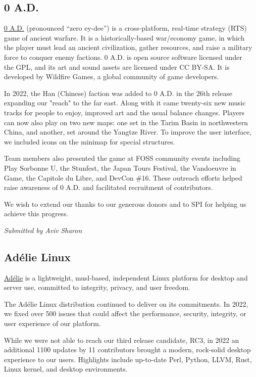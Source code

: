 \documentclass[a4paper]{report}
\begin{document}
\subsection{0 A.D.}

\href{https://play0ad.com/}{0 A.D.} (pronounced ``zero ey-dee'') is a cross-platform, real-time strategy (RTS) game of ancient warfare. It is a historically-based war/economy game, in which the player must lead an ancient civilization, gather resources, and raise a military force to conquer enemy factions. 0 A.D. is open source software licensed under the GPL, and its art and sound assets are licensed under CC BY-SA. It is developed by Wildfire Games, a global community of game developers.

In 2022, the Han (Chinese) faction was added to 0 A.D. in the 26th release expanding our "reach" to the far east. Along with it came twenty-six new music tracks for people to enjoy, improved art and the usual balance changes. Players can now also play on two new maps: one set in the Tarim Basin in northwestern China, and another, set around the Yangtze River. To improve the user interface, we included icons on the minimap for special
structures.

Team members also presented the game at FOSS community events including Play Sorbonne U, the Stunfest, the Japan Tours Festival, the Vandoeuvre in Game, the Capitole du Libre, and DevCon \#16. These outreach efforts helped raise awareness of 0 A.D. and facilitated recruitment of contributors.

We wish to extend our thanks to our generous donors and to SPI for helping us achieve this progress.

{\em Submitted by Aviv Sharon}

\subsection{Adélie Linux}

\href{https://www.adelielinux.org/}{Adélie} is a lightweight, musl-based, independent Linux platform for desktop and server use, committed to integrity, privacy, and user freedom.

The Adélie Linux distribution continued to deliver on its commitments. In 2022, we fixed over 500 issues that could affect the performance, security, integrity, or user experience of our platform.

While we were not able to reach our third release candidate, RC3, in 2022 an additional 1100 updates by 11 contributors brought a modern, rock-solid desktop experience to our users. Highlights include up-to-date Perl, Python, LLVM, Rust, Linux kernel, and desktop environments.
\end{document}
